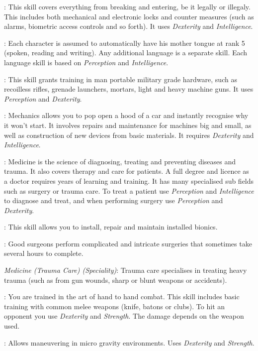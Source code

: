 : This skill covers everything from breaking and entering, be
it legally or illegaly. This includes both mechanical and electronic locks and
counter measures (such as alarms, biometric access controls and so forth). It
uses \emph{Dexterity} and \emph{Intelligence}.

: Each character is assumed to automatically have his mother
tongue at rank 5 (spoken, reading and writing). Any additional language is a
separate skill. Each language skill is based on \emph{Perception} and
\emph{Intelligence}.

: This skill grants training in man portable military
grade hardware, such as recoilless rifles, grenade launchers, mortars, light
and heavy machine guns. It uses \emph{Perception} and \emph{Dexterity}.

: Mechanics allows you to pop open a hood of a car and instantly
recognise why it won't start. It involves repairs and maintenance for machines
big and small, as well as construction of new devices from basic materials. It
requires \emph{Dexterity} and \emph{Intelligence}.

: Medicine is the science of diagnosing, treating and
preventing diseases and trauma. It also covers therapy and care for patients.
A full degree and licence as a doctor requires years of learning and training.
It has many specialised sub fields such as surgery or trauma care. To treat a
patient use \emph{Perception} and \emph{Intelligence} to diagnose and treat,
and when performing surgery use \emph{Perception} and \emph{Dexterity}.

: This skill allows you to install, repair
and maintain installed bionics.

: Good surgeons perform complicated and
intricate surgeries that sometimes take several hours to complete.

\emph{Medicine (Trauma Care) (Speciality)}: Trauma care specialises in treating
heavy trauma (such as from gun wounds, sharp or blunt weapons or accidents).

: You are trained in the art of hand to hand combat. This
skill includes basic training with common melee weapons (knife, batons or
clubs). To hit an opponent you use \emph{Dexterity} and \emph{Strength}.
The damage depends on the weapon used.

: Allows maneuvering in micro gravity environments. Uses
\emph{Dexterity} and \emph{Strength}.

